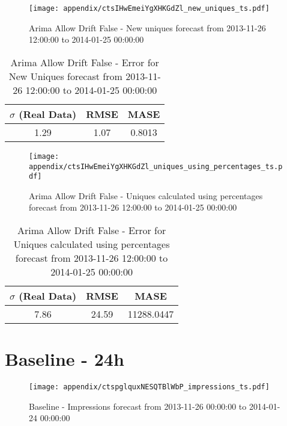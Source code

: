\begin{figure}[H] \begin{center} \leavevmode
\texttt{[image: appendix/ctsIHwEmeiYgXHKGdZl\_new\_uniques\_ts.pdf]} \caption{
Arima Allow Drift False - New uniques forecast from 2013-11-26 12:00:00 to 2014-01-25 00:00:00} \label{fig:appendix/ctsIHwEmeiYgXHKGdZl_new_uniques_ts.pdf} \end{center}
\end{figure}

\begin{table}[H]
\centering
\footnotesize
\begin{tabular}{ccc}
$\sigma$ (Real Data) & RMSE & MASE   \\ \hline
1.29 & 1.07 & 0.8013 \\
\end{tabular}

\vspace{0.5cm}

\caption{
Arima Allow Drift False - Error for New Uniques forecast from 2013-11-26 12:00:00 to 2014-01-25 00:00:00}
\end{table}

\begin{figure}[H] \begin{center} \leavevmode
\texttt{[image: appendix/ctsIHwEmeiYgXHKGdZl\_uniques\_using\_percentages\_ts.pdf]} \caption{
Arima Allow Drift False - Uniques calculated using percentages forecast from 2013-11-26 12:00:00 to 2014-01-25 00:00:00} \label{fig:appendix/ctsIHwEmeiYgXHKGdZl_uniques_using_percentages_ts.pdf} \end{center}
\end{figure}

\begin{table}[H]
\centering
\footnotesize
\begin{tabular}{ccc}
$\sigma$ (Real Data) & RMSE & MASE   \\ \hline
7.86 & 24.59 & 11288.0447 \\
\end{tabular}

\vspace{0.5cm}

\caption{
Arima Allow Drift False - Error for Uniques calculated using percentages forecast from 2013-11-26 12:00:00 to 2014-01-25 00:00:00}
\end{table}

\section{Baseline - 24h}
\begin{figure}[H] \begin{center} \leavevmode
\texttt{[image: appendix/ctspglquxNESQTBlWbP\_impressions\_ts.pdf]} \caption{
Baseline - Impressions forecast from 2013-11-26 00:00:00 to 2014-01-24 00:00:00} \label{fig:appendix/ctspglquxNESQTBlWbP_impressions_ts.pdf} \end{center}
\end{figure}

